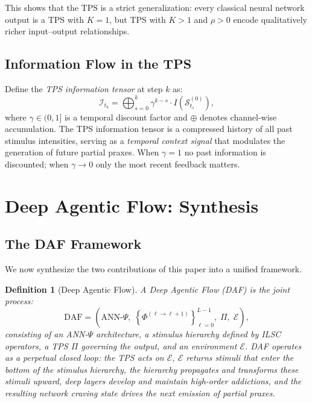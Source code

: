 \documentclass[12pt,a4paper]{article}
\newtheorem{definition}{Definition}
\newcommand{\tens}[1]{\boldsymbol{\mathcal{#1}}}
\begin{document}
This shows that the TPS is a strict generalization: every classical neural network
output is a TPS with $K=1$, but TPS with $K > 1$ and $\rho > 0$ encode
qualitatively richer input--output relationships.

\subsection{Information Flow in the TPS}

Define the \textit{TPS information tensor} at step $k$ as:
\begin{equation}
\mathcal{I}_{t_k} = \bigoplus_{s=0}^{k} \gamma^{k-s} \cdot
I\!\left(\tens{S}_{t_s}^{(0)}\right),
\label{eq:info_tensor}
\end{equation}
where $\gamma \in (0,1]$ is a temporal discount factor and $\oplus$ denotes
channel-wise accumulation. The TPS information tensor is a compressed history of
all past stimulus intensities, serving as a \textit{temporal context signal} that
modulates the generation of future partial praxes. When $\gamma = 1$ no past
information is discounted; when $\gamma \to 0$ only the most recent feedback
matters.

\section{Deep Agentic Flow: Synthesis}
\label{sec:daf}

\subsection{The DAF Framework}

We now synthesize the two contributions of this paper into a unified framework.

\begin{definition}[Deep Agentic Flow]
\label{def:daf}
A \emph{Deep Agentic Flow} (DAF) is the joint process:
\[
\text{DAF} = \left(
\text{ANN-}\Psi,\;
\left\{\Phi^{(\ell\to\ell+1)}\right\}_{\ell=0}^{L-1},\;
\Pi,\;
\mathcal{E}
\right),
\]
consisting of an ANN-$\Psi$ architecture, a stimulus hierarchy defined by ILSC
operators, a TPS $\Pi$ governing the output, and an environment $\mathcal{E}$.
DAF operates as a perpetual closed loop: the TPS acts on $\mathcal{E}$,
$\mathcal{E}$ returns stimuli that enter the bottom of the stimulus hierarchy,
the hierarchy propagates and transforms these stimuli upward, deep layers
develop and maintain high-order addictions, and the resulting network craving
state drives the next emission of partial praxes.
\end{definition}
\end{document}
